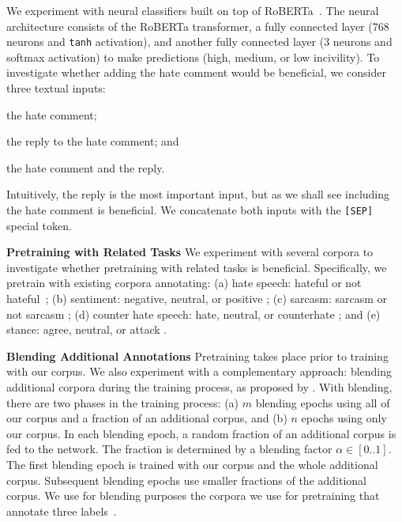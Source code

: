 \documentclass[11pt]{article}
\begin{document}
	We experiment with neural classifiers built on top of RoBERTa~\cite{DBLP:journals/corr/abs-1907-11692}. 
	The neural architecture consists of the RoBERTa transformer, 
	a fully connected layer (768 neurons and \texttt{tanh} activation), 
	and 
	another fully connected layer (3 neurons and softmax activation) to make predictions (high, medium, or low incivility). 
	To investigate whether adding the hate comment would be beneficial, we consider three textual inputs:
	\begin{compactitem}
		\item the hate comment;
		\item the reply to the hate comment; and
		\item the hate comment and the reply.
	\end{compactitem}
	
	Intuitively, the reply is the most important input, but as we shall see including the hate comment is beneficial.
	We concatenate both inputs with the \texttt{[SEP]} special token. 
	
	\noindent
	\textbf{Pretraining with Related Tasks} 
	We experiment with several corpora to investigate whether pretraining with related tasks is beneficial. 
	Specifically, we pretrain with existing corpora annotating: 
	(a) hate speech: hateful or not hateful~\cite{hateoffensive}; 
	(b) sentiment: negative, neutral, or positive \cite{rosenthal-etal-2017-semeval}; 
	(c) sarcasm: sarcasm or not sarcasm \cite{ghosh-etal-2020-report}; 
	(d) counter hate speech: hate, neutral, or counterhate \cite{yu-etal-2022-hate}; and
	(e) stance: agree, neutral, or attack \cite{pougubiyong2021debagreement}.
	

	
	\noindent
	\textbf{Blending Additional Annotations}
	Pretraining takes place prior to training with our corpus.
	We also experiment with a complementary approach: blending additional corpora during the training process, as proposed by \citet{shnarch-etal-2018-will}.
	With blending, there are two phases in the training process: 
	(a) $\mathit{m}$ blending epochs using all of our corpus and a fraction of an additional corpus,
	and
	(b) $\mathit{n}$ epochs using only our corpus. 
	In each blending epoch, a random fraction of an additional corpus is fed to the network.
	The fraction is determined by a blending factor $\alpha \in [0..1]$. 
	The first blending epoch is trained with our corpus and the whole additional corpus.
	Subsequent blending epochs use smaller fractions of the additional corpus.
	We use for blending purposes the corpora we use for pretraining that annotate three labels~\cite{rosenthal-etal-2017-semeval,pougubiyong2021debagreement,yu-etal-2022-hate}.
\end{document}

